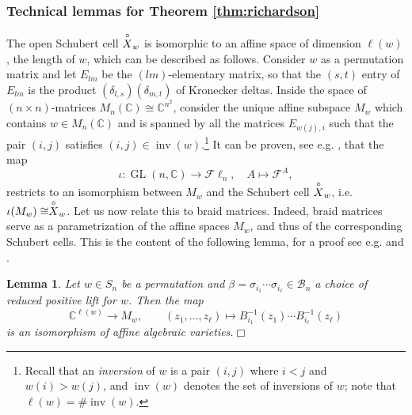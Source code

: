 \documentclass[10pt]{amsart}
\theoremstyle{plain}
\newtheorem{lemma}[thm]{Lemma}
\theoremstyle{definition}
\theoremstyle{remark}
\numberwithin{equation}{section}
\newcommand{\lr}{\longrightarrow}
\newcommand{\GL}{\operatorname{GL}}
\newcommand{\bC}{\mathbb{C}}
\newcommand{\cB}{\mathcal{B}}
\newcommand{\cF}{\mathscr{F}}
\newcommand{\Fl}{\mathscr{F}\ell}
\newcommand{\schub}{\buildrel\circ \over X}
\DeclareMathOperator{\inv}{inv}
\newcommand{\s}{\sigma}
\newcommand{\JS}[1]{{\color{cyan}{{\bf Jos\'e}: #1}}}
\newcommand{\MG}[1]{{\color{teal}{{\bf Misha}: #1}}}
\begin{document}
\subsubsection{Technical lemmas for Theorem \ref{thm:richardson}}\label{sssec:lemmas_rich} The open Schubert cell $\schub_{w}$ is isomorphic to an affine space of dimension $\ell(w)$, the length of $w$, which can be described as follows. Consider $w$ as a permutation matrix and let $E_{lm}$ be the $(lm)$-elementary matrix, so that the $(s,t)$ entry of $E_{lm}$ is the product $(\delta_{l,s})(\delta_{m,t})$ of Kronecker deltas. Inside the space of $(n\times n)$-matrices $M_n(\bC)\cong\bC^{n^2}$, consider the unique affine subspace $M_w$ which contains $w\in M_n(\bC)$ and is spanned by all the matrices $E_{w(j),i}$ such that the pair $(i, j)$ satisfies $(i, j) \in \inv(w)$.\footnote{Recall that an \emph{inversion} of $w$ is a pair $(i, j)$ where $i < j$ and $w(i) > w(j)$, and $\inv(w)$ denotes the set of inversions of $w$; note that $\ell(w) = \#\inv(w)$.} It can be proven, see e.g. \cite[Proposition 1.12]{SpeyerSurvey}, that the map
$$\iota:\GL(n,\bC)\lr \Fl_n,\quad A \mapsto \cF^{A},$$
restricts to an isomorphism between $M_{w}$ and the Schubert cell $\schub_{w}$, i.e. $\iota(M_{w})\cong\schub_{w}$. Let us now relate this to braid matrices. Indeed, braid matrices serve as a parametrization of the affine spaces $M_{w}$, and thus of the corresponding Schubert cells. This is the content of the following lemma, for a proof see e.g. \cite[Proposition 5.1.5]{Mellit} and \cite[Section 2]{CGGS}.%

\begin{lemma}\label{lemma:cells1}
	Let $w \in S_{n}$ be a permutation and $\beta = \sigma_{i_1}\cdots \sigma_{i_{\ell}}\in\cB_n$ a choice of reduced positive lift for $w$. Then the map
	$$\bC^{\ell(w)} \to M_{w}, \qquad (z_1, \dots, z_{\ell}) \mapsto B_{i_1}^{-1}(z_1)\cdots B_{i_{\ell}}^{-1}(z_{\ell})
	$$
	\noindent is an isomorphism of affine algebraic varieties.\hfill$\Box$
\end{lemma}


	
\end{document}
